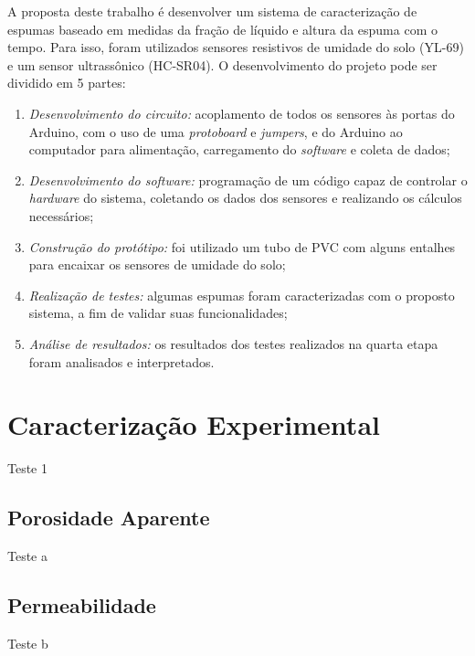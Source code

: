 A proposta deste trabalho é desenvolver um sistema de caracterização de espumas baseado em medidas da fração de líquido e altura da espuma com o tempo. Para isso, foram utilizados sensores resistivos de umidade do solo (YL-69) e um sensor ultrassônico (HC-SR04). O desenvolvimento do projeto pode ser dividido em 5 partes:

\begin{enumerate}[label=\itshape\roman*]

\item \textit{Desenvolvimento do circuito:} acoplamento de todos os sensores às portas do Arduino, com o uso de uma \textit{protoboard} e \textit{jumpers}, e do Arduino ao computador para alimentação, carregamento do \textit{software} e coleta de dados;

\item \textit{Desenvolvimento do software:} programação de um código capaz de controlar o \textit{hardware} do sistema, coletando os dados dos sensores e realizando os cálculos necessários;

\item \textit{Construção do protótipo:} foi utilizado um tubo de PVC com alguns entalhes para encaixar os sensores de umidade do solo;

\item \textit{Realização de testes:} algumas espumas foram caracterizadas com o proposto sistema, a fim de validar suas funcionalidades;

\item \textit{Análise de resultados:} os resultados dos testes realizados na quarta etapa foram analisados e interpretados.

\end{enumerate}

        
\section{Caracterização Experimental}\label{mat:exp}
Teste 1

    \subsection{Porosidade Aparente}\label{mat:porosidade}
    Teste a

    \subsection{Permeabilidade}\label{mat:perm}
    Teste b

